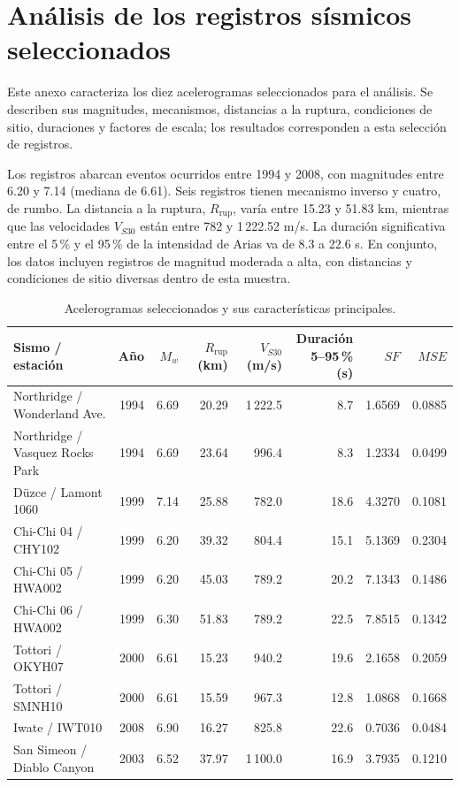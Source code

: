 \documentclass[12pt,oneside]{report}
\begin{document}
\chapter{Análisis de los registros sísmicos seleccionados}
\label{app:registros-seleccionados}

Este anexo caracteriza los diez acelerogramas seleccionados para el análisis.
Se describen sus magnitudes, mecanismos, distancias a la ruptura, condiciones
de sitio, duraciones y factores de escala; los resultados corresponden a esta
selección de registros.

Los registros abarcan eventos ocurridos entre 1994 y 2008, con magnitudes
entre 6.20 y 7.14 (mediana de 6.61). Seis registros tienen mecanismo inverso
y cuatro, de rumbo. La distancia a la ruptura, $R_{\mathrm{rup}}$,
varía entre 15.23 y 51.83 km, mientras que las velocidades $V_{S30}$ están
entre 782 y 1\,222.52 m/s. La duración significativa entre el 5\,\% y el
95\,\% de la intensidad de Arias va de 8.3 a 22.6 s. En conjunto, los datos
incluyen registros de magnitud moderada a alta, con distancias y condiciones
de sitio diversas dentro de esta muestra.

\begin{table}[H]
\centering
\small
\caption{Acelerogramas seleccionados y sus características principales.}
\label{tab:registros-seleccionados}
\begin{tabular}{@{}p{4.5cm} r r r r r r r@{}}
\toprule
Sismo / estación & Año & $M_w$ & \shortstack{$R_{\mathrm{rup}}$\\(km)} &
\shortstack{$V_{S30}$\\(m/s)} & \shortstack{Duración\\5--95\,\% (s)} & $SF$ & $MSE$ \\
\midrule
Northridge / Wonderland Ave. & 1994 & 6.69 & 20.29 & 1\,222.5 & 8.7 & 1.6569 & 0.0885 \\
Northridge / Vasquez Rocks Park & 1994 & 6.69 & 23.64 & 996.4 & 8.3 & 1.2334 & 0.0499 \\
Düzce / Lamont 1060 & 1999 & 7.14 & 25.88 & 782.0 & 18.6 & 4.3270 & 0.1081 \\
Chi-Chi 04 / CHY102 & 1999 & 6.20 & 39.32 & 804.4 & 15.1 & 5.1369 & 0.2304 \\
Chi-Chi 05 / HWA002 & 1999 & 6.20 & 45.03 & 789.2 & 20.2 & 7.1343 & 0.1486 \\
Chi-Chi 06 / HWA002 & 1999 & 6.30 & 51.83 & 789.2 & 22.5 & 7.8515 & 0.1342 \\
Tottori / OKYH07 & 2000 & 6.61 & 15.23 & 940.2 & 19.6 & 2.1658 & 0.2059 \\
Tottori / SMNH10 & 2000 & 6.61 & 15.59 & 967.3 & 12.8 & 1.0868 & 0.1668 \\
Iwate / IWT010 & 2008 & 6.90 & 16.27 & 825.8 & 22.6 & 0.7036 & 0.0484 \\
San Simeon / Diablo Canyon & 2003 & 6.52 & 37.97 & 1\,100.0 & 16.9 & 3.7935 & 0.1210 \\
\bottomrule
\end{tabular}
\end{table}
\end{document}
